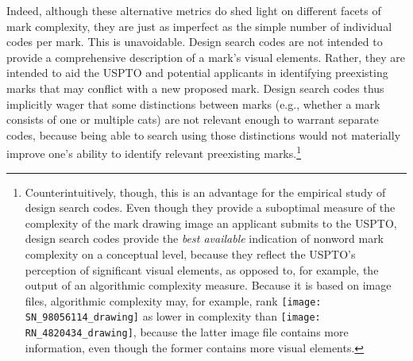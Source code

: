\documentclass[letterpaper, 11pt, oneside]{article}
\begin{document}
Indeed, although these alternative metrics do shed light on different facets of mark complexity, they are just as imperfect as the simple number of individual codes per mark. This is unavoidable. Design search codes are not intended to provide a comprehensive description of a mark's visual elements. Rather, they are intended to aid the USPTO and potential applicants in identifying preexisting marks that may conflict with a new proposed mark. Design search codes thus implicitly wager that some distinctions between marks (e.g., whether a mark consists of one or multiple cats) are not relevant enough to warrant separate codes, because being able to search using those distinctions would not materially improve one's ability to identify relevant preexisting marks.\footnote{Counterintuitively, though, this is an advantage for the empirical study of design search codes. Even though they provide a suboptimal measure of the complexity of the mark drawing image an applicant submits to the USPTO, design search codes provide the \textit{best available} indication of nonword mark complexity on a conceptual level, because they reflect the USPTO's perception of significant visual elements, as opposed to, for example, the output of an algorithmic complexity measure. Because it is based on image files, algorithmic complexity may, for example, rank \texttt{[image: SN\_98056114\_drawing]} as lower in complexity than \texttt{[image: RN\_4820434\_drawing]}, because the latter image file contains more information, even though the former contains more visual elements.}
\end{document}
